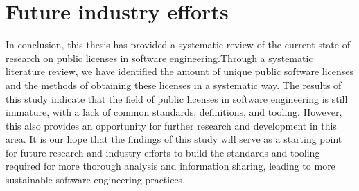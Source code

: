 \section{Future industry efforts}


In conclusion, this thesis has provided a systematic review of the current state of research on public licenses in software engineering.Through a systematic literature review, we have identified the amount of unique public software licenses and the methods of obtaining these licenses in a systematic way. The results of this study indicate that the field of public licenses in software engineering is still immature, with a lack of common standards, definitions, and tooling. However, this also provides an opportunity for further research and development in this area. It is our hope that the findings of this study will serve as a starting point for future research and industry efforts to build the standards and tooling required for more thorough analysis and information sharing, leading to more sustainable software engineering practices.